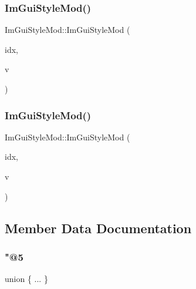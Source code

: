 \subsubsection{\texorpdfstring{Im\+Gui\+Style\+Mod()}{ImGuiStyleMod()}\hspace{0.1cm}{\footnotesize\ttfamily [2/3]}}
{\footnotesize\ttfamily Im\+Gui\+Style\+Mod\+::\+Im\+Gui\+Style\+Mod (\begin{DoxyParamCaption}\item[{Im\+Gui\+Style\+Var}]{idx,  }\item[{float}]{v }\end{DoxyParamCaption})\hspace{0.3cm}{\ttfamily [inline]}}

\mbox{\label{structImGuiStyleMod_a28647cc4ab8b95b8ee30e0fc7401ae07}} 
\subsubsection{\texorpdfstring{Im\+Gui\+Style\+Mod()}{ImGuiStyleMod()}\hspace{0.1cm}{\footnotesize\ttfamily [3/3]}}
{\footnotesize\ttfamily Im\+Gui\+Style\+Mod\+::\+Im\+Gui\+Style\+Mod (\begin{DoxyParamCaption}\item[{Im\+Gui\+Style\+Var}]{idx,  }\item[{\hyperlink{structImVec2}{Im\+Vec2}}]{v }\end{DoxyParamCaption})\hspace{0.3cm}{\ttfamily [inline]}}



\subsection{Member Data Documentation}
\mbox{\label{structImGuiStyleMod_a976f5327626997a0b963599c9e453b3c}} 
\subsubsection{\texorpdfstring{"@5}{@5}}
{\footnotesize\ttfamily union \{ ... \} }

\mbox{\label{structImGuiStyleMod_af36b5cf1100de970d78a53db937be949}} 

